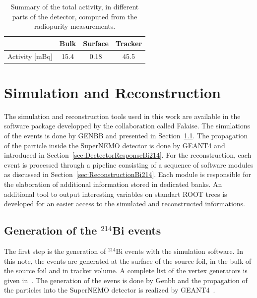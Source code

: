 \documentclass[main.tex]{subfiles}
\begin{document}
\begin{table}[h!]
\begin{center}
\begin{tabular}{c|c|c|c}
               & Bulk & Surface & Tracker \\[0.1cm]
\hline
Activity [mBq] & 15.4 & 0.18    & 45.5    \\[0.1cm]
\hline
\end{tabular}
\end{center}
\caption{Summary of the total activity, in different parts of the detector, computed from the radiopurity measurements.}
\label{activity_measurement_different_parts}
\end{table}



\section{Simulation and Reconstruction}


\noindent The simulation and reconstruction tools used in this work are available in the software package developped by the collaboration called Falaise. The simulations of the events is done by GENBB and presented in Section~\ref{sec:GenerationBi214}. The propagation of the particle inside the SuperNEMO detector is done by GEANT4 and introduced in Section~\ref{sec:DectectorResponseBi214}. For the reconstruction, each event is processed through a pipeline consisting of a sequence of software modules as discussed in Section~\ref{sec:ReconstructionBi214}. Each module is responsible for the elaboration of additional information stored in dedicated banks. An additional tool to output interesting variables on standart ROOT trees is developed for an easier access to the simulated and reconstructed informations.


\subsection{Generation of the $^{\text{214}}$Bi events}\label{sec:GenerationBi214}


\noindent The first step is the generation of $^{\text{214}}$Bi events with the simulation software. In this note, the events are generated at the surface of the source foil, in the bulk of the source foil and in tracker volume. A complete list of the vertex generators is given in~\cite{FalaiseUserGuide}. The generation of the evens is done by Genbb and the propagation of the particles into the SuperNEMO detector is realized by GEANT4~\cite{GEANT4}.
\end{document}
